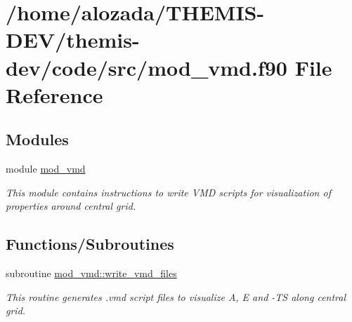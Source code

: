 \hypertarget{mod__vmd_8f90}{}\section{/home/alozada/\+T\+H\+E\+M\+I\+S-\/\+D\+E\+V/themis-\/dev/code/src/mod\+\_\+vmd.f90 File Reference}
\label{mod__vmd_8f90}
\subsection*{Modules}
\begin{DoxyCompactItemize}
\item 
module \hyperlink{namespacemod__vmd}{mod\+\_\+vmd}
\begin{DoxyCompactList}\small\item\em This module contains instructions to write V\+MD scripts for visualization of properties around central grid. \end{DoxyCompactList}\end{DoxyCompactItemize}
\subsection*{Functions/\+Subroutines}
\begin{DoxyCompactItemize}
\item 
subroutine \hyperlink{namespacemod__vmd_a22ecc122e04e73317480e5b7d6ba38ce}{mod\+\_\+vmd\+::write\+\_\+vmd\+\_\+files}
\begin{DoxyCompactList}\small\item\em This routine generates .vmd script files to visualize A, E and -\/\+TS along central grid. \end{DoxyCompactList}\end{DoxyCompactItemize}
